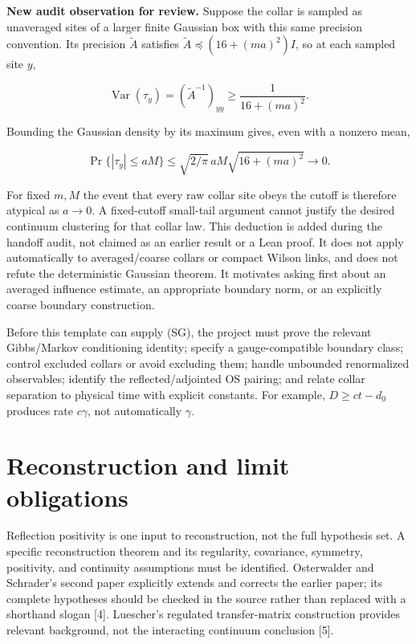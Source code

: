 \documentclass[
  11pt,
  letterpaper,
]{article}
\begin{document}
\textbf{New audit observation for review.} Suppose the collar is sampled
as unaveraged sites of a larger finite Gaussian box with this same
precision convention. Its precision \(\widetilde A\) satisfies
\(\widetilde A\preceq(16+(ma)^2)I\), so at each sampled site \(y\),

\[
\operatorname{Var}(\tau_y)=(\widetilde A^{-1})_{yy}
\ge\frac1{16+(ma)^2}.
\]

Bounding the Gaussian density by its maximum gives, even with a nonzero
mean,

\[
\Pr\{|\tau_y|\le aM\}
\le\sqrt{2/\pi}\,aM\sqrt{16+(ma)^2}\longrightarrow0.
\]

For fixed \(m,M\) the event that every raw collar site obeys the cutoff
is therefore atypical as \(a\to0\). A fixed-cutoff small-tail argument
cannot justify the desired continuum clustering for that collar law.
This deduction is added during the handoff audit, not claimed as an
earlier result or a Lean proof. It does not apply automatically to
averaged/coarse collars or compact Wilson links, and does not refute the
deterministic Gaussian theorem. It motivates asking first about an
averaged influence estimate, an appropriate boundary norm, or an
explicitly coarse boundary construction.

Before this template can supply (SG), the project must prove the
relevant Gibbs/Markov conditioning identity; specify a gauge-compatible
boundary class; control excluded collars or avoid excluding them; handle
unbounded renormalized observables; identify the reflected/adjointed OS
pairing; and relate collar separation to physical time with explicit
constants. For example, \(D\ge ct-d_0\) produces rate \(c\gamma\), not
automatically \(\gamma\).

\section{Reconstruction and limit
obligations}\label{reconstruction-and-limit-obligations}

Reflection positivity is one input to reconstruction, not the full
hypothesis set. A specific reconstruction theorem and its regularity,
covariance, symmetry, positivity, and continuity assumptions must be
identified. Osterwalder and Schrader's second paper explicitly extends
and corrects the earlier paper; its complete hypotheses should be
checked in the source rather than replaced with a shorthand slogan
{[}4{]}. Luescher's regulated transfer-matrix construction provides
relevant background, not the interacting continuum conclusion {[}5{]}.
\end{document}

